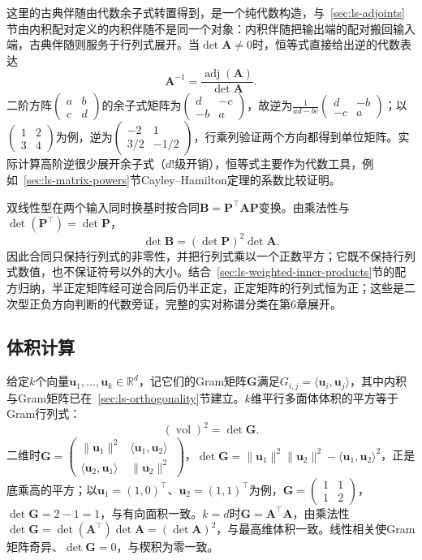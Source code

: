 这里的古典伴随由代数余子式转置得到，是一个纯代数构造，与~\ref{sec:ls-adjoints}节由内积配对定义的内积伴随不是同一个对象：内积伴随把输出端的配对搬回输入端，古典伴随则服务于行列式展开。当$\det\bm A\neq0$时，恒等式直接给出逆的代数表达
\[
 \bm A^{-1}=\frac{\operatorname{adj}(\bm A)}{\det\bm A}.
\]
二阶方阵$\begin{pmatrix}a&b\\c&d\end{pmatrix}$的余子式矩阵为$\begin{pmatrix}d&-c\\-b&a\end{pmatrix}$，故逆为$\frac1{ad-bc}\begin{pmatrix}d&-b\\-c&a\end{pmatrix}$；以$\begin{pmatrix}1&2\\3&4\end{pmatrix}$为例，逆为$\begin{pmatrix}-2&1\\3/2&-1/2\end{pmatrix}$，行乘列验证两个方向都得到单位矩阵。实际计算高阶逆很少展开余子式（$d!$级开销），恒等式主要作为代数工具，例如~\ref{sec:ls-matrix-powers}节Cayley--Hamilton定理的系数比较证明。

双线性型在两个输入同时换基时按合同$\bm B=\bm P^\top\bm A\bm P$变换。由乘法性与$\det(\bm P^\top)=\det\bm P$，
\[
 \det\bm B=(\det\bm P)^2\det\bm A.
\]
因此合同只保持行列式的非零性，并把行列式乘以一个正数平方；它既不保持行列式数值，也不保证符号以外的大小。结合~\ref{sec:ls-weighted-inner-products}节的配方归纳，半正定矩阵经可逆合同后仍半正定，正定矩阵的行列式恒为正；这些是二次型正负方向判断的代数旁证，完整的实对称谱分类在第6章展开。

\subsection{体积计算}

给定$k$个向量$\bm u_1,\ldots,\bm u_k\in\mathbb R^d$，记它们的Gram矩阵$\bm G$满足$G_{i,j}=\langle\bm u_i,\bm u_j\rangle$，其中内积与Gram矩阵已在~\ref{sec:ls-orthogonality}节建立。$k$维平行多面体体积的平方等于Gram行列式：
\[
 (\operatorname{vol})^2=\det\bm G.
\]
二维时$\bm G=\begin{pmatrix}\lVert\bm u_1\rVert^2&\langle\bm u_1,\bm u_2\rangle\\\langle\bm u_2,\bm u_1\rangle&\lVert\bm u_2\rVert^2\end{pmatrix}$，$\det\bm G=\lVert\bm u_1\rVert^2\lVert\bm u_2\rVert^2-\langle\bm u_1,\bm u_2\rangle^2$，正是底乘高的平方；以$\bm u_1=(1,0)^\top$、$\bm u_2=(1,1)^\top$为例，$\bm G=\begin{pmatrix}1&1\\1&2\end{pmatrix}$，$\det\bm G=2-1=1$，与有向面积一致。$k=d$时$\bm G=\bm A^\top\bm A$，由乘法性$\det\bm G=\det(\bm A^\top)\det\bm A=(\det\bm A)^2$，与最高维体积一致。线性相关使Gram矩阵奇异、$\det\bm G=0$，与楔积为零一致。

